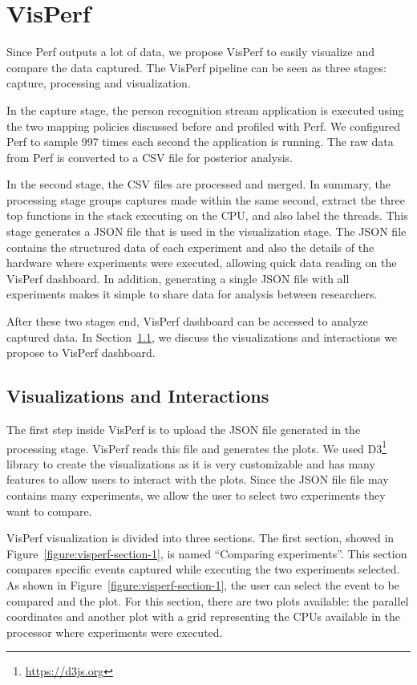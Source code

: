 \section{VisPerf}

Since Perf outputs a lot of data, we propose VisPerf to easily visualize and compare the data captured. The VisPerf pipeline can be seen as three stages: capture, processing and visualization.

In the capture stage, the person recognition stream application is executed using the two mapping policies discussed before and profiled with Perf. We configured Perf to sample 997 times each second the application is running. The raw data from Perf is converted to a CSV file for posterior analysis.

In the second stage, the CSV files are processed and merged. In summary, the processing stage groups captures made within the same second, extract the three top functions in the stack executing on the CPU, and also label the threads. This stage generates a JSON file that is used in the visualization stage. The JSON file contains the structured data of each experiment and also the details of the hardware where experiments were executed, allowing quick data reading on the VisPerf dashboard. In addition, generating a single JSON file with all experiments makes it simple to share data for analysis between researchers.

After these two stages end, VisPerf dashboard can be accessed to analyze captured data. In Section~\ref{section:visualization-interaction}, we discuss the visualizations and interactions we propose to VisPerf dashboard.


\subsection{Visualizations and Interactions} \label{section:visualization-interaction}

The first step inside VisPerf is to upload the JSON file generated in the processing stage. VisPerf reads this file and generates the plots. We used D3\footnote{\url{https://d3js.org}} library to create the visualizations as it is very customizable and has many features to allow users to interact with the plots. Since the JSON file file may contains many experiments, we allow the user to select two experiments they want to compare.

VisPerf visualization is divided into three sections. The first section, showed in Figure~\ref{figure:visperf-section-1}, is named ``Comparing experiments''. This section compares specific events captured while executing the two experiments selected. As shown in Figure~\ref{figure:visperf-section-1}, the user can select the event to be compared and the plot. For this section, there are two plots available: the parallel coordinates and another plot with a grid representing the CPUs available in the processor where experiments were executed.

